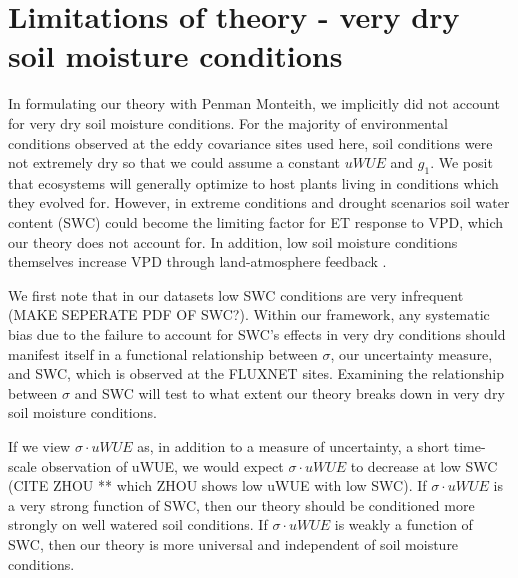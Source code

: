 \documentclass[draft,linenumbers]{agujournal}
\begin{document}
\section{Limitations of theory - very dry soil moisture conditions}
In formulating our theory with Penman Monteith, we implicitly did not account for very dry soil moisture conditions. For the majority of environmental conditions  observed at the eddy covariance sites used here, soil conditions were not extremely dry so that we could assume a constant $uWUE$ and $g_1$. We posit that ecosystems will generally optimize to host plants living in conditions which they evolved for. However, in extreme conditions and drought scenarios soil water content (SWC) could become the limiting factor for ET response to VPD, which our theory does not account for. In addition, low soil moisture conditions themselves increase VPD through land-atmosphere feedback \citep[][]{Bouchet_1963, Morton_1965, Brutsaert_1999, Ozdogan_2006, Salvucci_2013, Gentine_2016, Berg_2016}.

We first note that in our datasets low SWC conditions are very infrequent (MAKE SEPERATE PDF OF SWC?). Within our framework, any systematic bias due to the  failure to account for SWC's effects in very dry conditions should manifest itself in a functional relationship between $\sigma$, our uncertainty measure, and SWC, which is observed at the FLUXNET sites. Examining the relationship between $\sigma$ and SWC will test to what extent our theory breaks down in very dry soil moisture conditions.

If we view $\sigma \cdot uWUE$ as, in addition to a measure of uncertainty, a short time-scale observation of uWUE, we would expect $\sigma \cdot uWUE$ to decrease at low SWC (CITE ZHOU ** which ZHOU shows low uWUE with low SWC). If $\sigma \cdot uWUE$ is a very strong function of SWC, then our theory should be conditioned more strongly on well watered soil conditions. If $\sigma \cdot uWUE$ is weakly a function of SWC, then our theory is more universal and independent of soil moisture conditions.
\end{document}
